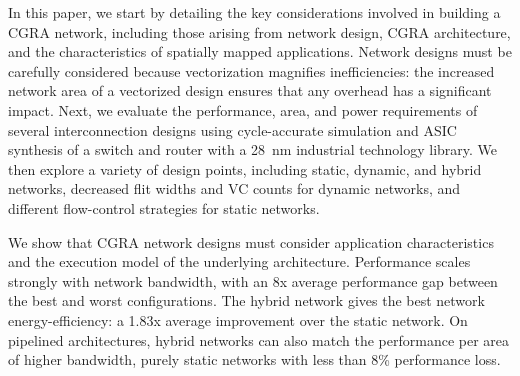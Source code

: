 In this paper, we start by detailing the key considerations involved in building a CGRA network, including those arising from network design, CGRA architecture, and the characteristics of spatially mapped applications.
Network designs must be carefully considered because vectorization magnifies inefficiencies: the increased network area of a vectorized design ensures that any overhead has a significant impact.
Next, we evaluate the performance, area, and power requirements of several interconnection designs using cycle-accurate simulation and ASIC synthesis of a switch and router with a \SI{28}{nm} industrial technology library.
We then explore a variety of design points, including static, dynamic, and hybrid networks, decreased flit widths and VC counts for dynamic networks, and different flow-control strategies for static networks.

We show that CGRA network designs must consider application characteristics and the execution model of the underlying architecture.
Performance scales strongly with network bandwidth, with an 8x average performance gap between the best and worst configurations. 
The hybrid network gives the best network energy-efficiency: a 1.83x average improvement over the static network. On pipelined architectures,
hybrid networks can also match the performance per area of higher bandwidth, purely static networks with less than 8\% performance loss.

